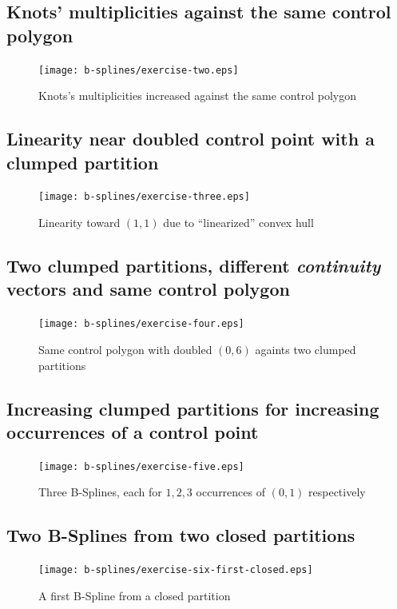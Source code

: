 \documentclass{article}
\begin{document}
\subsection{Knots' multiplicities against the same control polygon}
\begin{figure}
  \centering
  \texttt{[image: b-splines/exercise-two.eps]}
  \caption{Knots's multiplicities increased against the same control polygon }
  \label{fig:bspline-exercise-two}
\end{figure}

\subsection{Linearity near doubled control point with a clumped partition}
\begin{figure}
  \centering
  \texttt{[image: b-splines/exercise-three.eps]}
  \caption{Linearity toward $(1,1)$ due to ``linearized'' convex hull}
  \label{fig:bspline-exercise-three}
\end{figure}

\subsection{Two clumped partitions, different \emph{continuity} vectors and same control polygon}
\begin{figure}
  \centering
  \texttt{[image: b-splines/exercise-four.eps]}
  \caption{Same control polygon with doubled $(0,6)$ againts two clumped partitions}
  \label{fig:bspline-exercise-four}
\end{figure}

\subsection{Increasing clumped partitions for increasing occurrences of a control point}
\begin{figure}
  \centering
  \texttt{[image: b-splines/exercise-five.eps]}
  \caption{Three B-Splines, each for $1,2,3$ occurrences of $(0,1)$ respectively }
  \label{fig:bspline-exercise-five}
\end{figure}

\subsection{Two B-Splines from two closed partitions}
\begin{figure}
  \centering
  \texttt{[image: b-splines/exercise-six-first-closed.eps]}
  \caption{A first B-Spline from a closed partition }
  \label{fig:bspline-exercise-six-first}
\end{figure}
\end{document}
